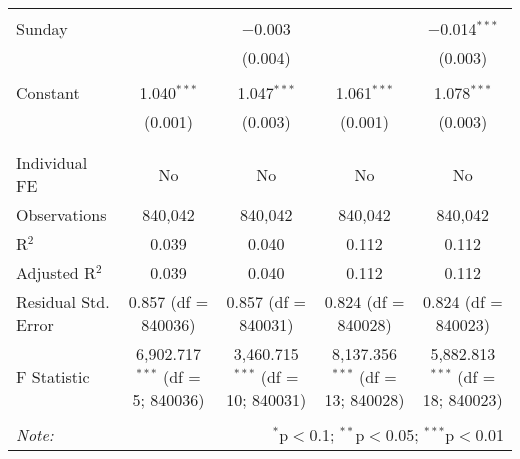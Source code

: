 \documentclass[
]{article}
\begin{document}
\begin{table}[!htbp]
{\begin{tabular}{@{\extracolsep{5pt}}lcccc}
  & & & & \\ 
 Sunday &  & $-$0.003 &  & $-$0.014$^{***}$ \\ 
  &  & (0.004) &  & (0.003) \\ 
  & & & & \\ 
 Constant & 1.040$^{***}$ & 1.047$^{***}$ & 1.061$^{***}$ & 1.078$^{***}$ \\ 
  & (0.001) & (0.003) & (0.001) & (0.003) \\ 
  & & & & \\ 
\hline \\[-1.8ex] 
Individual FE & No & No & No & No \\ 
Observations & 840,042 & 840,042 & 840,042 & 840,042 \\ 
R$^{2}$ & 0.039 & 0.040 & 0.112 & 0.112 \\ 
Adjusted R$^{2}$ & 0.039 & 0.040 & 0.112 & 0.112 \\ 
Residual Std. Error & 0.857 (df = 840036) & 0.857 (df = 840031) & 0.824 (df = 840028) & 0.824 (df = 840023) \\ 
F Statistic & 6,902.717$^{***}$ (df = 5; 840036) & 3,460.715$^{***}$ (df = 10; 840031) & 8,137.356$^{***}$ (df = 13; 840028) & 5,882.813$^{***}$ (df = 18; 840023) \\ 
\hline 
\hline \\[-1.8ex] 
\textit{Note:}  & \multicolumn{4}{r}{$^{*}$p$<$0.1; $^{**}$p$<$0.05; $^{***}$p$<$0.01} \\ 
\end{tabular}
} 
\end{table} 
\newpage
\end{document}
